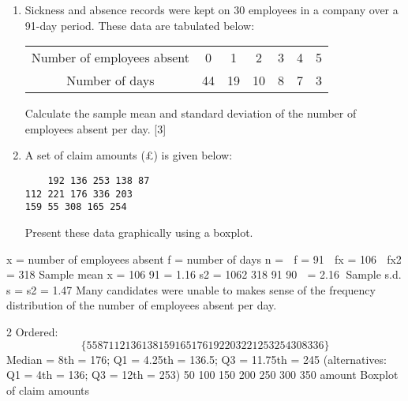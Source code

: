 \documentclass[a4paper,12pt]{article}
\begin{document}
\begin{enumerate}

\item Sickness and absence records were kept on 30 employees in a company over a 91-day
period. These data are tabulated below:
\begin{center}
\begin{tabular}{c|c|c|c|c|c|c|}
Number of employees absent & 0 & 1 & 2 & 3 & 4 & 5\\
Number of days & 44 & 19 & 10 & 8 & 7 & 3 \\
\end{tabular}
\end{center}


Calculate the sample mean and standard deviation of the number of employees absent
per day. [3]

\item A set of claim amounts (£) is given below:
\begin{verbatim}
    192 136 253 138 87
112 221 176 336 203
159 55 308 165 254
\end{verbatim}

Present these data graphically using a boxplot. 
 
\end{enumerate}


 x = number of employees absent
f = number of days
n =  f = 91  fx = 106  fx2 = 318
Sample mean x = 106
91
= 1.16
s2 =
1062 318
91
90

= 2.16  Sample s.d. s = s2 = 1.47
Many candidates were unable to makes sense of the frequency distribution of the number of employees
absent per day.

2 Ordered: 
\[\{55 87 112 136 138 159 165 176 192 203 221 253 254 308 336\}\]
Median = 8th = 176; Q1 = 4.25th = 136.5; Q3 = 11.75th = 245
(alternatives: Q1 = 4th = 136; Q3 = 12th = 253)
50 100 150 200 250 300 350
amount
Boxplot of claim amounts
\end{document}
